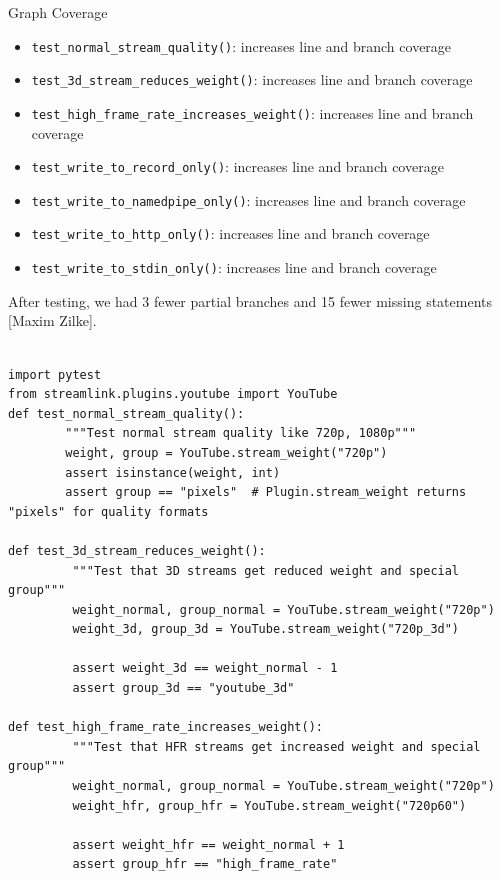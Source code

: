 \documentclass[a4paper]{scrreprt}
\newcounter{question}
\begin{document}
\begin{question}{Graph Coverage}
\begin{enumerate}[topsep=0pt, leftmargin=*]
\begin{answer}
\begin{itemize}
    \item \texttt{test\_normal\_stream\_quality()}: increases line and branch coverage
    \item \texttt{test\_3d\_stream\_reduces\_weight()}: increases line and branch coverage
    \item \texttt{test\_high\_frame\_rate\_increases\_weight()}: increases line and branch coverage
    \item \texttt{test\_write\_to\_record\_only()}: increases line and branch coverage
    \item \texttt{test\_write\_to\_namedpipe\_only()}: increases line and branch coverage
    \item \texttt{test\_write\_to\_http\_only()}: increases line and branch coverage
    \item \texttt{test\_write\_to\_stdin\_only()}: increases line and branch coverage
\end{itemize}

After testing, we had 3 fewer partial branches and 15 fewer missing statements [Maxim Zilke].



\begin{lstlisting}[caption={Maxim Zilke: statement coverage tests }, label={}]

import pytest
from streamlink.plugins.youtube import YouTube
def test_normal_stream_quality():
        """Test normal stream quality like 720p, 1080p"""
        weight, group = YouTube.stream_weight("720p")
        assert isinstance(weight, int)
        assert group == "pixels"  # Plugin.stream_weight returns "pixels" for quality formats
        
def test_3d_stream_reduces_weight():
         """Test that 3D streams get reduced weight and special group"""
         weight_normal, group_normal = YouTube.stream_weight("720p")
         weight_3d, group_3d = YouTube.stream_weight("720p_3d")
        
         assert weight_3d == weight_normal - 1
         assert group_3d == "youtube_3d"
 
def test_high_frame_rate_increases_weight():
         """Test that HFR streams get increased weight and special group"""
         weight_normal, group_normal = YouTube.stream_weight("720p")
         weight_hfr, group_hfr = YouTube.stream_weight("720p60")
          
         assert weight_hfr == weight_normal + 1
         assert group_hfr == "high_frame_rate"
      \end{lstlisting}  
    

\end{answer}
\end{enumerate}
\end{question}
\end{document}
